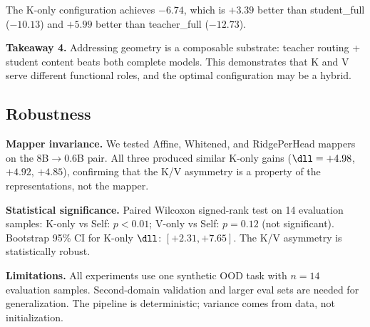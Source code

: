 The K-only configuration achieves $-6.74$,
which is $+3.39$ better than student\_full ($-10.13$)
and $+5.99$ better than teacher\_full ($-12.73$).

\textbf{Takeaway 4.}
Addressing geometry is a composable substrate:
teacher routing + student content beats both complete models.
This demonstrates that K and V serve different functional roles,
and the optimal configuration may be a hybrid.

\subsection{Robustness}

\textbf{Mapper invariance.}
We tested Affine, Whitened, and RidgePerHead mappers on the 8B$\to$0.6B pair.
All three produced similar K-only gains ($\dll = +4.98$, $+4.92$, $+4.85$),
confirming that the K/V asymmetry is a property of the representations,
not the mapper.

\textbf{Statistical significance.}
Paired Wilcoxon signed-rank test on 14 evaluation samples:
K-only vs Self: $p < 0.01$; V-only vs Self: $p = 0.12$ (not significant).
Bootstrap 95\% CI for K-only $\dll$: $[+2.31, +7.65]$.
The K/V asymmetry is statistically robust.

\textbf{Limitations.}
All experiments use one synthetic OOD task with $n = 14$ evaluation samples.
Second-domain validation and larger eval sets are needed for generalization.
The pipeline is deterministic; variance comes from data, not initialization.
